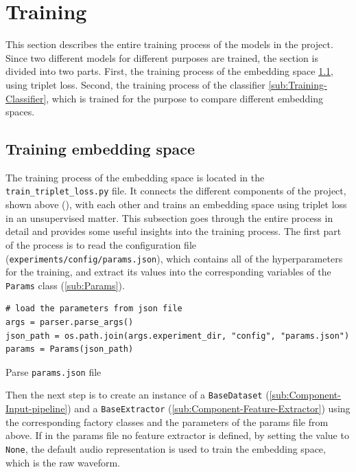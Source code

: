 \section{Training}
\label{sec:Training}
This section describes the entire training process of the models in the project. Since two different models for different purposes are trained, the section is divided into two parts. First, the training process of the embedding space \ref{sub:Training-Embedding-Space}, using triplet loss. Second, the training process of the classifier \ref{sub:Training-Classifier}, which is trained for the purpose to compare different embedding spaces.

\subsection{Training embedding space}
\label{sub:Training-Embedding-Space}
The training process of the embedding space is located in the \texttt{train\_triplet\_loss.py} file. It connects the different components of the project, shown above (), with each other and trains an embedding space using triplet loss in an unsupervised matter. This subsection goes through the entire process in detail and provides some useful insights into the training process.
\newline
\newline
The first part of the process is to read the configuration file (\texttt{experiments/config/params.json}), which contains all of the hyperparameters for the training, and extract its values into the corresponding variables of the \texttt{Params} class (\ref{sub:Params}).

\begin{code}[htbp]
\begin{verbatim}
# load the parameters from json file
args = parser.parse_args()
json_path = os.path.join(args.experiment_dir, "config", "params.json")
params = Params(json_path)
\end{verbatim}
\caption{Parse \texttt{params.json} file}
\label{code:Parse-Params-File}
\end{code}
\noindent
Then the next step is to create an instance of a \texttt{BaseDataset} (\ref{sub:Component-Input-pipeline}) and a \texttt{BaseExtractor} (\ref{sub:Component-Feature-Extractor}) using the corresponding factory classes and the parameters of the params file from above. If in the params file no feature extractor is defined, by setting the value to \texttt{None}, the default audio representation is used to train the embedding space, which is the raw waveform.

